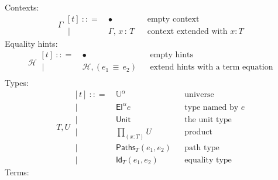\documentclass{article}
\newcommand{\G}{\Gamma} %
\newcommand{\T}{T} %
\newcommand{\U}{U} %
\newcommand{\x}{x} %
\newcommand{\e}{e} %
\newcommand{\bnf}{\ \mathrel{{:}{:}{=}}\ }
\newcommand{\bnfor}{\ \mid\ \ }
\newcommand{\ctxempty}{\bullet} %
\newcommand{\ctxextend}[3]{#1,\, #2\, {:}\, #3} %
\newcommand{\Universe}[1]{\mathbb{U}^{#1}} %
\newcommand{\El}[2]{\mathsf{El}^{#1} #2} %
\newcommand{\Unit}{\mathsf{Unit}} %
\newcommand{\Prod}[2]{{\textstyle\prod_{(#1 {:} #2)}}} %
\newcommand{\PrEqual}[3]{\mathsf{Paths}_{#1}(#2,#3)} %
\newcommand{\JuEqual}[3]{\mathsf{Id}_{#1}(#2,#3)} %
\newcommand{\eqtermhint}[3]{(#1 \,{\equiv}\, #2 )} %
\renewcommand{\H}{\mathcal{H}}      %
\newcommand{\hintextend}[4]{#1, \eqtermhint{#2}{#3}{#4}} %
\begin{document}
Contexts:
%
\begin{equation*}
  \G
  \begin{aligned}[t]
    \bnf   {}& \ctxempty & & \text{empty context}\\
    \bnfor {}& \ctxextend{\G}{\x}{\T} & & \text{context extended with $x : T$}
  \end{aligned}
\end{equation*}
%
Equality hints:
%
\begin{equation*}
  \H
  \begin{aligned}[t]
    \bnf   {}& \ctxempty & & \text{empty hints}\\
    \bnfor {}& \hintextend{\H}{\e_1}{\e_2}{\T} & & \text{extend hints with a term equation} \\
  \end{aligned}
\end{equation*}
%
Types:
%
\begin{equation*}
  \T, \U
  \begin{aligned}[t]
    \bnf   {}& \Universe{\alpha} & & \text{universe}\\
    \bnfor {}& \El{\alpha}{\e} & & \text{type named by $e$}\\
    \bnfor {}& \Unit & & \text{the unit type}\\
    \bnfor {}& \Prod{x}{\T} \U & & \text{product}\\
    \bnfor {}& \PrEqual{T}{\e_1}{\e_2} & & \text{path type}\\
    \bnfor {}& \JuEqual{T}{\e_1}{\e_2} & & \text{equality type}
  \end{aligned}
\end{equation*}
%
Terms:
%
\end{document}
